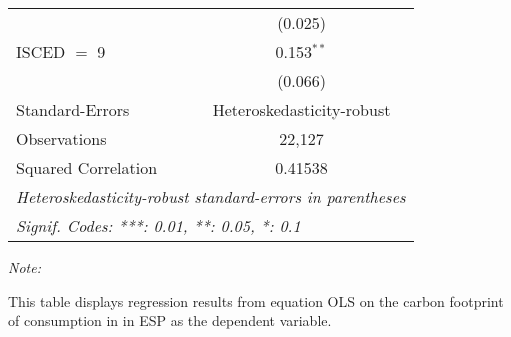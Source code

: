 \begin{table}[htbp!]
\begin{adjustbox}{width = 1\textwidth, max height = 0.95\textheight, center}
\begin{threeparttable}[b]
\begin{tabular}{lc}
                                & (0.025)\\   
            ISCED $=$ 9         & 0.153$^{**}$\\   
                                & (0.066)\\   
            \midrule 
            Standard-Errors     & Heteroskedasticity-robust \\   
            Observations        & 22,127\\  
            Squared Correlation & 0.41538\\  
            \midrule \midrule
            \multicolumn{2}{l}{\emph{Heteroskedasticity-robust standard-errors in parentheses}}\\
            \multicolumn{2}{l}{\emph{Signif. Codes: ***: 0.01, **: 0.05, *: 0.1}}\\
         \end{tabular}
         
         \begin{tablenotes}\item \medskip \textit{Note:}
            \item This table displays regression results from equation OLS on the carbon footprint of consumption in  in ESP as the dependent variable.  
         \end{tablenotes}
      \end{threeparttable}
   \end{adjustbox}
\end{table}


